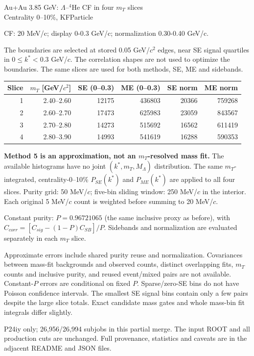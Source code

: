 \documentclass[10pt,a4paper]{article}
\begin{document}
\begin{center}\Large Au+Au 3.85 GeV: $\Lambda$--$^4$He CF in four $m_T$ slices\\
\large Centrality 0--10\%, KFParticle\end{center}
\noindent CF: 20 MeV/c; display 0-0.3 GeV/c; normalization 0.30-0.40 GeV/c.

\medskip
\noindent The boundaries are selected at stored 0.05 GeV/$c^2$ edges,
near SE signal quartiles in $0\leq k^*<0.3$ GeV/$c$.
The correlation shapes are not used to optimize the boundaries.
The same slices are used for both methods, SE, ME and sidebands.

\begin{center}\small\begin{tabular}{rrrrrr}\toprule
Slice & $m_T$ [GeV/$c^2$] & SE (0--0.3) & ME (0--0.3) & SE norm & ME norm\\\midrule
1 & 2.40–2.60 & 12175 & 436803 & 20366 & 759268 \\
2 & 2.60–2.70 & 17473 & 625983 & 23059 & 843567 \\
3 & 2.70–2.80 & 14273 & 515692 & 16562 & 611419 \\
4 & 2.80–3.90 & 14993 & 541619 & 16288 & 590353 \\
\bottomrule\end{tabular}\end{center}

\noindent\textbf{Method 5 is an approximation, not an $m_T$-resolved mass fit.}
The available histograms have no joint $(k^*,m_T,M_\Lambda)$ distribution.
The same $m_T$-integrated, centrality-0--10\% $P_{SE}(k^*)$ and $P_{ME}(k^*)$
are applied to all four slices. Purity grid: 50 MeV/$c$;
five-bin sliding window: 250 MeV/$c$ in the interior.
Each original 5 MeV/$c$ count is weighted before summing to 20 MeV/$c$.

\medskip
\noindent Constant purity: $P=0.96721065$ (the same inclusive proxy as before),
with $C_{corr}=[C_{sig}-(1-P)C_{SB}]/P$. Sidebands and normalization
are evaluated separately in each $m_T$ slice.

\medskip
\noindent Approximate errors include shared purity reuse and normalization.
Covariances between mass-fit backgrounds and observed counts, distinct overlapping
fits, $m_T$ counts and inclusive purity, and reused event/mixed pairs are not available.
Constant-$P$ errors are conditional on fixed $P$.
Sparse/zero-SE bins do not have Poisson confidence intervals.
The smallest SE signal bins contain only a few pairs despite the large slice totals.
Exact candidate mass gates and whole mass-bin fit integrals differ slightly.

\medskip
{} P24iy only; 26,956/26,994 subjobs in this partial merge.
The input ROOT and all production cuts are unchanged.
Full provenance, statistics and caveats are in the adjacent README and JSON files.
\clearpage



\end{document}
